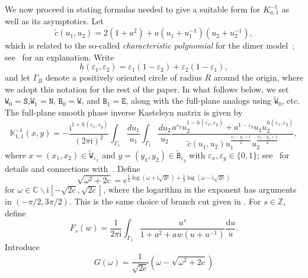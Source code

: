 \documentclass[11pt,twoside]{amsart}
\theoremstyle{plain}
\numberwithin{quest}{section}
\theoremstyle{remark}
\numberwithin{rem}{section}
\theoremstyle{definition}
\newcommand{\eps}{\varepsilon}
\begin{document}
	We now proceed in stating formulas needed to give a suitable form for $K^{-1}_{a,1}$ as well as its asymptotics. 
	Let
	\begin{equation*} \label{ctilde}
		\tilde{c} (u_1,u_2)=2(1+a^2) + a(u_1+u_1^{-1})(u_2+u_2^{-1}),
	\end{equation*} 
	which is related to the so-called \emph{characteristic polynomial} for the dimer model~\cite{KOS03}; see~\cite[(4.11)]{CJ16} for an explanation. Write
	\begin{equation}
		h(\eps_1,\eps_2)=\eps_1(1-\eps_2)+\eps_2(1-\eps_1),
	\end{equation}
	and let  $\Gamma_R$ denote a positively oriented circle of radius $R$ around the origin, where we adopt this notation for the rest of the paper.  In what follows below, we set $\mathtt{W}_0=\mathtt{S}$,$\mathtt{W}_1=\mathtt{N}$, $\mathtt{B}_0=\mathtt{W}$, and $\mathtt{B}_1=\mathtt{E}$, along with the full-plane analogs using $\tilde{\mathtt{W}}_0$, etc.
	The full-plane smooth phase inverse Kasteleyn matrix is given by
	\begin{equation*}\label{smoothphaseeqn}
		\mathbb{K}^{-1}_{1,1}(x,y)=-\frac{\mathrm{i}^{1+h(\eps_x,\eps_y)}}{(2 \pi \mathrm{i})^2} 
		\int_{\Gamma_1} \frac{du_1}{u_1}  \int_{\Gamma_1} \frac{du_2}{u_2} \frac{a^{\eps_y} u_2^{1-h(\eps_x,\eps_y)} +a^{1-\eps_y} u_1 u_2^{h(\eps_x,\eps_y)}}{\tilde{c}(u_1,u_2) u_1^{\frac{x_1-y_1+1}{2}} u_2^{\frac{x_2-y_2+1}{2}}},
	\end{equation*}
	where 
	$x=(x_1,x_2)\in \tilde{\mathtt{W}}_{\eps_x}$ and $y=(y_1,y_2)\in \tilde{\mathtt{B}}_{\eps_y}$ with $\eps_x,\eps_y \in \{0,1\}$; see~\cite[Section 4]{CJ16} for details and connections with~\cite{KOS03}. Define
	\begin{equation*}
		\sqrt{\omega^2+2c} =e^{\frac{1}{2}\log (\omega + \mathrm{i} \sqrt{2c}) + \frac{1}{2}\log (\omega - \mathrm{i} \sqrt{2c})}
	\end{equation*}
	for $\omega \in \mathbb{C}\backslash \mathrm{i}[-\sqrt{2c},\sqrt{2c}]$, where the logarithm in the exponent has arguments in $(-\pi/2,3\pi/2)$. This is the same choice of branch cut given in \cite{CJ16}.  For $s\in \mathbb{Z}$, define
	\begin{equation}\label{eq:prev:Fs}
		F_s(w)=\frac{1}{2\pi \mathrm{i}} \int_{\Gamma_1} \frac{u^s}{1+a^2+a w(u+u^{-1})} \frac{\mathrm{d}u}{u}.
	\end{equation}
	Introduce 
	\begin{equation}
		G(\omega)=\frac{1}{\sqrt{2c}}(\omega-\sqrt{\omega^2+2c}) \label{eq:def:G}
	\end{equation}
\end{document}
